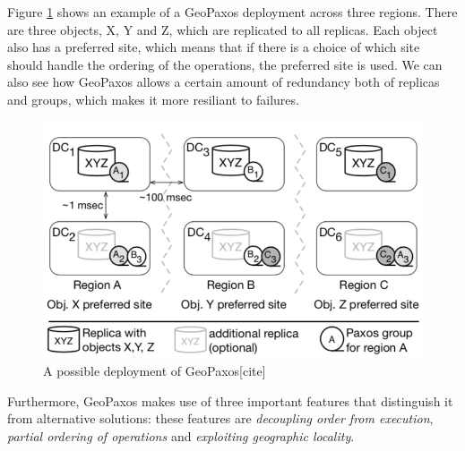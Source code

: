 Figure \ref{fig:datacenters} shows an example of a GeoPaxos deployment across three regions. There are three objects, X, Y and Z, which are replicated to all replicas. Each object also has a preferred site, which means that if there is a choice of which site should handle the ordering of the operations, the preferred site is used. We can also see how GeoPaxos allows a certain amount of redundancy both of replicas and groups, which makes it more resiliant to failures.

\begin{figure}[htb]
  \centering
  \includegraphics[width=\textwidth,height=\textheight,keepaspectratio]{img/datacenters.png}

  \caption{A possible deployment of GeoPaxos[cite]} 
  \label{fig:datacenters}
\end{figure}

Furthermore, GeoPaxos makes use of three important features that distinguish it from alternative solutions: these features are \emph{decoupling order from execution}, \emph{partial ordering of operations} and \emph{exploiting geographic locality}. 

